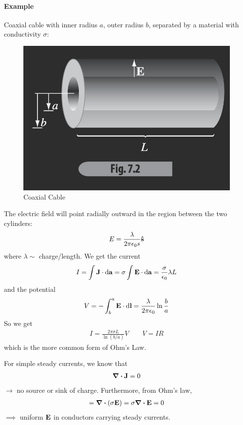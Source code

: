 \documentclass[../main.tex]{subfiles}
\begin{document}
\paragraph{Example} Coaxial cable with inner radius $a$, outer radius $b$,
separated by a material with conductivity $\sigma$:

\begin{figure}[ht]
    \centering
    \includegraphics[width=0.5\linewidth]{fig7_2.png}
    \caption{Coaxial Cable}
    \label{fig:gr7_2}
\end{figure}

The electric field will point radially outward in the region between the two cylinders:
\begin{align*}
    E = \frac{\lambda}{2\pi \epsilon_0 s} \vu s
\end{align*}
where $\lambda \sim$ charge/length. We get the current
\begin{align*}
    I = \int \vb J \cdot \dd{\vb a} = \sigma \int \vb E \cdot \dd{\vb a} = \frac{\sigma}{\epsilon_0} \lambda L
\end{align*}
and the potential
\begin{align*}
    V = -\int_b^a \vb E \cdot \dd{\vb l} = \frac{\lambda}{2\pi \epsilon_0} \ln \frac{b}{a}
\end{align*}
So we get
\begin{align*}
    \boxed{
        I = \frac{2\pi \sigma L}{\ln(b/a)} V 
    }
    \qquad \boxed{V = IR}
\end{align*}
which is the more common form of Ohm's Law.

For simple steady currents, we know that
\begin{align*}
    \div \vb J = 0
\end{align*}
$\to$ no source or sink of charge. Furthermore, from Ohm's law,
\begin{align*}
    = \div (\sigma \vb E) = \sigma \div \vb E = 0
\end{align*}
$\implies$ uniform $\vb E$ in conductors carrying steady currents.
\end{document}
